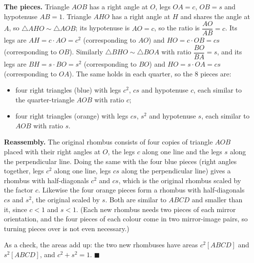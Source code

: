 \textbf{The pieces.} Triangle $AOB$ has a right angle at $O$, legs $OA=c$, $OB=s$ and hypotenuse $AB=1$. Triangle $AHO$ has a right angle at $H$ and shares the angle at $A$, so $\triangle AHO\sim\triangle AOB$; its hypotenuse is $AO=c$, so the ratio is $\dfrac{AO}{AB}=c$. Its legs are $AH=c\cdot AO=c^2$ (corresponding to $AO$) and $HO=c\cdot OB=cs$ (corresponding to $OB$). Similarly $\triangle BHO\sim\triangle BOA$ with ratio $\dfrac{BO}{BA}=s$, and its legs are $BH=s\cdot BO=s^2$ (corresponding to $BO$) and $HO=s\cdot OA=cs$ (corresponding to $OA$). The same holds in each quarter, so the $8$ pieces are:
\begin{itemize}
\item four right triangles (blue) with legs $c^2$, $cs$ and hypotenuse $c$, each similar to the quarter-triangle $AOB$ with ratio $c$;
\item four right triangles (orange) with legs $cs$, $s^2$ and hypotenuse $s$, each similar to $AOB$ with ratio $s$.
\end{itemize}

\textbf{Reassembly.} The original rhombus consists of four copies of triangle $AOB$ placed with their right angles at $O$, the legs $c$ along one line and the legs $s$ along the perpendicular line. Doing the same with the four blue pieces (right angles together, legs $c^2$ along one line, legs $cs$ along the perpendicular line) gives a rhombus with half-diagonals $c^2$ and $cs$, which is the original rhombus scaled by the factor $c$. Likewise the four orange pieces form a rhombus with half-diagonals $cs$ and $s^2$, the original scaled by $s$. Both are similar to $ABCD$ and smaller than it, since $c<1$ and $s<1$. (Each new rhombus needs two pieces of each mirror orientation, and the four pieces of each colour come in two mirror-image pairs, so turning pieces over is not even necessary.)

As a check, the areas add up: the two new rhombuses have areas $c^2[ABCD]$ and $s^2[ABCD]$, and $c^2+s^2=1$. $\blacksquare$
